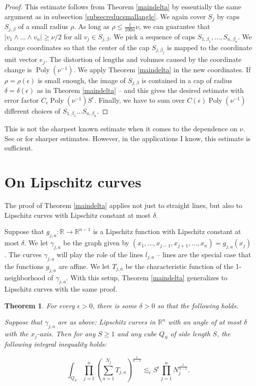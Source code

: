 \documentclass{amsart}
\newtheorem{theorem}[prop]{Theorem}
\DeclareMathOperator{\Poly}{Poly}
\newcommand{\eps}{\epsilon}
\newcommand{\RR}{\mathbb{R}}
\begin{document}
\begin{proof} This estimate follows from Theorem \ref{maindelta} by essentially the same argument as in subsection \ref{subsecreducsmallangle}.  We again cover $S_j$ by caps $S_{j, \beta}$ of a small radius $\rho$.  As long as $\rho \le \frac{1}{100n} \nu$, we can guarantee that $|v_1 \wedge ... \wedge v_n |  \ge \nu/2$ for all $v_j \in S_{j, \beta}$.  We pick a sequence of caps $S_{1, \beta_1}, ..., S_{n, \beta_n}$.  We change coordinates so that the center of the cap $S_{j, \beta_j}$ is mapped to the coordinate unit vector $e_j$.  The distortion of lengths and volumes caused by the coordinate change is $\Poly(\nu^{-1})$.  
We apply Theorem \ref{maindelta} in the new coordinates.  If $\rho = \rho(\eps)$ is small enough, the image of $S_{j,\beta}$ is contained in a cap of radius $\delta = \delta(\eps)$ as in Theorem \ref{maindelta} -- and this gives the desired estimate with error factor $C_\eps \Poly(\nu^{-1}) S^\eps$.  Finally, we have to sum over $C(\eps) \Poly(\nu^{-1})$ different choices of $S_{1, \beta_1} ... S_{n, \beta_n}$.  
\end{proof}

This is not the sharpest known estimate when it comes to the dependence on $\nu$.  See \cite{BCT} or \cite{G} for sharper estimates.  However, in the applications I know, this estimate is sufficient.


\section{On Lipschitz curves}

The proof of Theorem \ref{maindelta} applies not just to straight lines, but also to Lipschitz curves with Lipschitz constant at most $\delta$.  

Suppose that $g_{j, a}: \RR \rightarrow \RR^{n-1}$ is a Lipschitz function with Lipschitz constant at most $\delta$.  We let $\gamma_{j,a}$ be the graph given by $(x_1, ..., x_{j-1}, x_{j+1}, ... , x_n) = g_{j,a}(x_j)$.  The curves $\gamma_{j,a}$ will play the role of the lines $l_{j,a}$ -- lines are the special case that the functions $g_{j,a}$ are affine.  We let $T_{j,a}$ be the characteristic function of the 1-neighborhood of $\gamma_{j,a}$.  With this setup, Theorem \ref{maindelta} generalizes to Lipschitz curves with the same proof.

\begin{theorem}
 For every $\eps > 0$, there is some $\delta > 0$ so that the following holds.  

Suppose that $\gamma_{j,a}$ are as above: Lipschitz curves in $\RR^n$ with an angle of at most $\delta$ with the $x_j$-axis.  Then for any $S \ge 1$ and any cube $Q_S$ of side length $S$, the following integral inequality holds:

\begin{equation} \label{multkakdeltalip} \int_{Q_S} \prod_{j=1}^n \left( \sum_{a = 1}^{N_j}  T_{j,a} \right)^{\frac{1}{n-1}}  \lesssim_\eps S^\eps \prod_{j=1}^n N_j^{\frac{1}{n-1}}. 
\end{equation}
\end{theorem}
\end{document}

